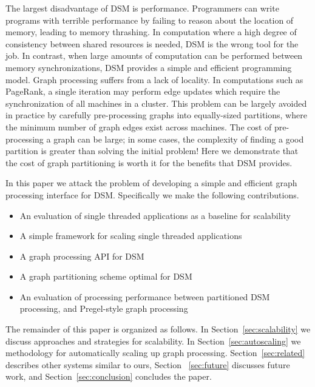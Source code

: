 The largest disadvantage of DSM is performance. Programmers can write
programs with terrible performance by failing to reason about the location
of memory, leading to memory thrashing. In computation where a high
degree of consistency between shared resources is needed, DSM is the 
wrong tool for the job. In contrast, when large amounts of computation can be
performed between memory synchronizations, DSM provides a simple and
efficient programming model. Graph processing suffers from a lack of
locality. In computations such as PageRank, a single iteration may
perform edge updates which require the synchronization of all
machines in a cluster. This problem can be largely avoided in practice
by carefully pre-processing graphs into equally-sized partitions, where 
the minimum number of graph edges exist across machines. The cost of pre-processing a
graph can be large; in some cases, the complexity of finding a good
partition is greater than solving the initial problem! Here we
demonstrate that the cost of graph partitioning is worth it for the
benefits that DSM provides.

In this paper we attack the problem of developing a simple and
efficient graph processing interface for DSM. Specifically we make the
following contributions.

\begin{itemize}
        \item An evaluation of single threaded applications as a baseline for scalability
        \item A simple framework for scaling single threaded applications
        \item A graph processing API for DSM
        \item A graph partitioning scheme optimal for DSM
        \item An evaluation of processing performance between partitioned DSM processing, and Pregel-style graph processing
\end{itemize}

The remainder of this paper is organized as follows. In
Section~\ref{sec:scalability} we discuss approaches and strategies for 
scalability. In Section~\ref{sec:autoscaling} we methodology for
automatically scaling up graph processing. Section~\ref{sec:related} 
describes other systems similar to ours, Section ~\ref{sec:future} discusses
future work, and Section~\ref{sec:conclusion} concludes the paper.
